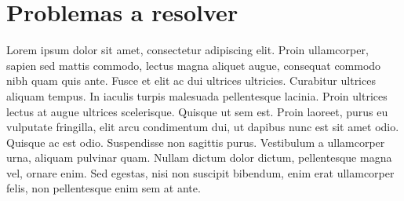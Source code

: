\documentclass[letterpaper,oneside,openany,11pt]{book}
\begin{document}




\chapter{Problemas a resolver}\label{cap.problemasresolver}
\noindent Lorem ipsum dolor sit amet, consectetur adipiscing elit. Proin ullamcorper, sapien sed mattis commodo, lectus magna aliquet augue, consequat commodo nibh quam quis ante. Fusce et elit ac dui ultrices ultricies. Curabitur ultrices aliquam tempus. In iaculis turpis malesuada pellentesque lacinia. Proin ultrices lectus at augue ultrices scelerisque. Quisque ut sem est. Proin laoreet, purus eu vulputate fringilla, elit arcu condimentum dui, ut dapibus nunc est sit amet odio. Quisque ac est odio. Suspendisse non sagittis purus. Vestibulum a ullamcorper urna, aliquam pulvinar quam. Nullam dictum dolor dictum, pellentesque magna vel, ornare enim. Sed egestas, nisi non suscipit bibendum, enim erat ullamcorper felis, non pellentesque enim sem at ante. \\



\end{document}
